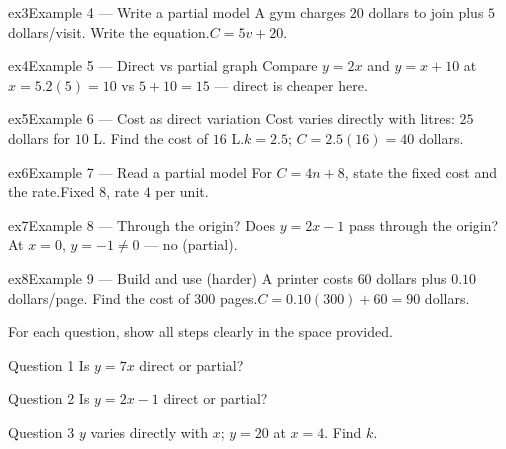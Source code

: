 \documentclass[11pt]{article}
\begin{document}
\begin{example}{ex3}{Example 4 --- Write a partial model}
A gym charges $20$ dollars to join plus $5$ dollars/visit. Write the equation.\soln $C=5v+20$.
\end{example}

\begin{example}{ex4}{Example 5 --- Direct vs partial graph}
Compare $y=2x$ and $y=x+10$ at $x=5$.\soln $2(5)=10$ vs $5+10=15$ — direct is cheaper here.
\end{example}

\begin{example}{ex5}{Example 6 --- Cost as direct variation}
Cost varies directly with litres: $25$ dollars for $10$ L. Find the cost of $16$ L.\soln $k=2.5$; $C=2.5(16)=40$ dollars.
\end{example}

\begin{example}{ex6}{Example 7 --- Read a partial model}
For $C=4n+8$, state the fixed cost and the rate.\soln Fixed $8$, rate $4$ per unit.
\end{example}

\begin{example}{ex7}{Example 8 --- Through the origin?}
Does $y=2x-1$ pass through the origin?\soln At $x=0$, $y=-1\neq0$ — no (partial).
\end{example}

\begin{example}{ex8}{Example 9 --- Build and use (harder)}
A printer costs $60$ dollars plus $0.10$ dollars/page. Find the cost of $300$ pages.\soln $C=0.10(300)+60=90$ dollars.
\end{example}

\clearpage
{}
For each question, show all steps clearly in the space provided.

\begin{qbox}{Question 1}
Is $y=7x$ direct or partial?\workspace{1.8cm}
\end{qbox}

\begin{qbox}{Question 2}
Is $y=2x-1$ direct or partial?\workspace{1.8cm}
\end{qbox}

\begin{qbox}{Question 3}
$y$ varies directly with $x$; $y=20$ at $x=4$. Find $k$.\workspace{2.0cm}
\end{qbox}
\end{document}
